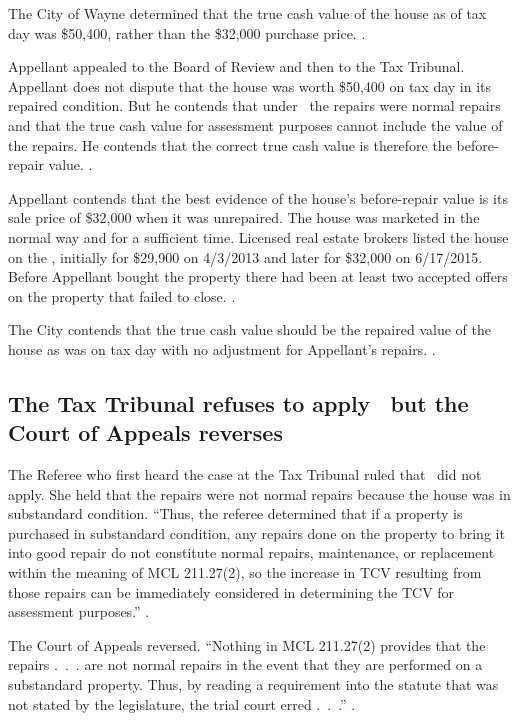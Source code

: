 \documentclass[12pt,\documentclassflag]{michiganCourtOfAppealsBrief}
\begin{document}
The City of Wayne determined that the true cash value of the house as of tax day was \$50,400, rather than the \$32,000 purchase price. \boardOfReviewDecision.

Appellant appealed to the Board of Review and then to the Tax Tribunal. Appellant does not dispute that the house was worth \$50,400 on tax day in its repaired condition. But he contends that under \mathieuGast\ the repairs were normal repairs and that the true cash value for assessment purposes cannot include the value of the repairs. He contends that the correct true cash value is therefore the before-repair value. \explanatoryLetter[].

Appellant contends that the best evidence of the house's before-repair value is its sale price of \$32,000 when it was unrepaired. The house was marketed in the normal way and for a sufficient time. Licensed real estate brokers listed the house on the \MLS, initially for \$29,900 on 4/3/2013 and later for \$32,000 on 6/17/2015. Before Appellant bought the property there had been at least two accepted offers on the property that failed to close. \mlsHistory[]. 

The City contends that the true cash value should be the repaired value of the house as was on tax day with no adjustment for Appellant's repairs. \cityEvidence.

\subsection{The Tax Tribunal refuses to apply \mathieuGast\ but the Court of Appeals reverses}

The Referee who first heard the case at the Tax Tribunal ruled that \mathieuGast\ did not apply. She held that the repairs were not normal repairs because the house was in substandard condition. ``Thus, the referee determined that if a property is purchased in substandard condition, any repairs done on the property to bring it into good repair do not constitute normal repairs, maintenance, or replacement within the meaning of MCL 211.27(2), so the increase in TCV resulting from those repairs can be immediately considered in determining the TCV for assessment purposes.'' .

The Court of Appeals reversed. ``Nothing in MCL 211.27(2) provides that the repairs .~.~. are not normal repairs in the event that they are performed on a substandard property. Thus, by reading a requirement into the statute that was not stated by the legislature, the trial court erred .~.~.'' .
\end{document}
